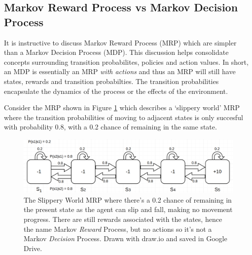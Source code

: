 \documentclass[a4paper,11pt]{article}
\begin{document}
\subsection{Markov Reward Process vs Markov Decision Process}

It is instructive to discuss Markov Reward Process (MRP) which are simpler than a Markov Decision Process (MDP).  This discussion helps consolidate concepts surrounding transition probabilites, policies and action values.  In short, an MDP is essentially an MRP {\it with actions} and thus an MRP will still have states, rewards and transition probabilties.  The transition probabilities encapsulate the dynamics of the process or the effects of the environment.  

Consider the MRP shown in Figure \ref{fig:slippery-world-mrp} which describes a `slippery world' MRP where the transition probabilities of moving to adjacent states is only succesful with probability 0.8, with a 0.2 chance of remaining in the same state.

\begin{figure}
    \includegraphics[width=\textwidth]{images/slippery_world_mrp.png}
    \caption{The Slippery World MRP where there's a 0.2 chance of remaining in the present state as the agent can slip and fall, making no movement progress.  There are still rewards associated with the states, hence the name Markov {\it Reward} Process, but no actions so it's not a Markov {\it Decision} Process.  Drawn with draw.io and saved in Google Drive.}
    \label{fig:slippery-world-mrp}
\end{figure}
\end{document}
